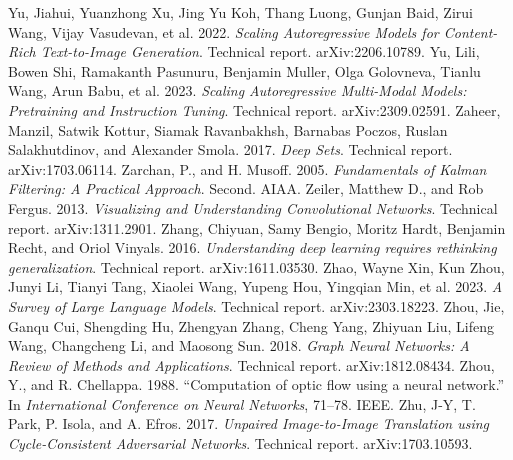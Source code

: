 Yu, Jiahui, Yuanzhong Xu, Jing Yu Koh, Thang Luong, Gunjan Baid, Zirui Wang, Vijay Vasudevan, et al. 2022. \emph{Scaling Autoregressive Models for Content-Rich Text-to-Image Generation}. Technical report. arXiv:2206.10789.
 Yu, Lili, Bowen Shi, Ramakanth Pasunuru, Benjamin Muller, Olga Golovneva, Tianlu Wang, Arun Babu, et al. 2023. \emph{Scaling Autoregressive Multi-Modal Models: Pretraining and Instruction Tuning}. Technical report. arXiv:2309.02591.
 Zaheer, Manzil, Satwik Kottur, Siamak Ravanbakhsh, Barnabas Poczos, Ruslan Salakhutdinov, and Alexander Smola. 2017. \emph{Deep Sets}. Technical report. arXiv:1703.06114.
 Zarchan, P., and H. Musoff. 2005. \emph{Fundamentals of Kalman Filtering: A Practical Approach}. Second. AIAA.
 Zeiler, Matthew D., and Rob Fergus. 2013. \emph{Visualizing and Understanding Convolutional Networks}. Technical report. arXiv:1311.2901.
 Zhang, Chiyuan, Samy Bengio, Moritz Hardt, Benjamin Recht, and Oriol Vinyals. 2016. \emph{Understanding deep learning requires rethinking generalization}. Technical report. arXiv:1611.03530.
 Zhao, Wayne Xin, Kun Zhou, Junyi Li, Tianyi Tang, Xiaolei Wang, Yupeng Hou, Yingqian Min, et al. 2023. \emph{A Survey of Large Language Models}. Technical report. arXiv:2303.18223.
 Zhou, Jie, Ganqu Cui, Shengding Hu, Zhengyan Zhang, Cheng Yang, Zhiyuan Liu, Lifeng Wang, Changcheng Li, and Maosong Sun. 2018. \emph{Graph Neural Networks: A Review of Methods and Applications}. Technical report. arXiv:1812.08434.
 Zhou, Y., and R. Chellappa. 1988. ``Computation of optic flow using a neural network.'' In \emph{International Conference on Neural Networks}, 71--78. IEEE.
 Zhu, J-Y, T. Park, P. Isola, and A. Efros. 2017. \emph{Unpaired Image-to-Image Translation using Cycle-Consistent Adversarial Networks}. Technical report. arXiv:1703.10593.
